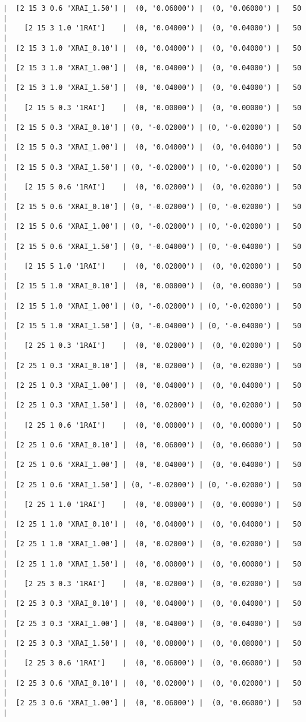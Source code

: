 \documentclass{article}
\begin{document}
\begin{verbatim}
|  [2 15 3 0.6 'XRAI_1.50'] |  (0, '0.06000') |  (0, '0.06000') |   50  |
|    [2 15 3 1.0 '1RAI']    |  (0, '0.04000') |  (0, '0.04000') |   50  |
|  [2 15 3 1.0 'XRAI_0.10'] |  (0, '0.04000') |  (0, '0.04000') |   50  |
|  [2 15 3 1.0 'XRAI_1.00'] |  (0, '0.04000') |  (0, '0.04000') |   50  |
|  [2 15 3 1.0 'XRAI_1.50'] |  (0, '0.04000') |  (0, '0.04000') |   50  |
|    [2 15 5 0.3 '1RAI']    |  (0, '0.00000') |  (0, '0.00000') |   50  |
|  [2 15 5 0.3 'XRAI_0.10'] | (0, '-0.02000') | (0, '-0.02000') |   50  |
|  [2 15 5 0.3 'XRAI_1.00'] |  (0, '0.04000') |  (0, '0.04000') |   50  |
|  [2 15 5 0.3 'XRAI_1.50'] | (0, '-0.02000') | (0, '-0.02000') |   50  |
|    [2 15 5 0.6 '1RAI']    |  (0, '0.02000') |  (0, '0.02000') |   50  |
|  [2 15 5 0.6 'XRAI_0.10'] | (0, '-0.02000') | (0, '-0.02000') |   50  |
|  [2 15 5 0.6 'XRAI_1.00'] | (0, '-0.02000') | (0, '-0.02000') |   50  |
|  [2 15 5 0.6 'XRAI_1.50'] | (0, '-0.04000') | (0, '-0.04000') |   50  |
|    [2 15 5 1.0 '1RAI']    |  (0, '0.02000') |  (0, '0.02000') |   50  |
|  [2 15 5 1.0 'XRAI_0.10'] |  (0, '0.00000') |  (0, '0.00000') |   50  |
|  [2 15 5 1.0 'XRAI_1.00'] | (0, '-0.02000') | (0, '-0.02000') |   50  |
|  [2 15 5 1.0 'XRAI_1.50'] | (0, '-0.04000') | (0, '-0.04000') |   50  |
|    [2 25 1 0.3 '1RAI']    |  (0, '0.02000') |  (0, '0.02000') |   50  |
|  [2 25 1 0.3 'XRAI_0.10'] |  (0, '0.02000') |  (0, '0.02000') |   50  |
|  [2 25 1 0.3 'XRAI_1.00'] |  (0, '0.04000') |  (0, '0.04000') |   50  |
|  [2 25 1 0.3 'XRAI_1.50'] |  (0, '0.02000') |  (0, '0.02000') |   50  |
|    [2 25 1 0.6 '1RAI']    |  (0, '0.00000') |  (0, '0.00000') |   50  |
|  [2 25 1 0.6 'XRAI_0.10'] |  (0, '0.06000') |  (0, '0.06000') |   50  |
|  [2 25 1 0.6 'XRAI_1.00'] |  (0, '0.04000') |  (0, '0.04000') |   50  |
|  [2 25 1 0.6 'XRAI_1.50'] | (0, '-0.02000') | (0, '-0.02000') |   50  |
|    [2 25 1 1.0 '1RAI']    |  (0, '0.00000') |  (0, '0.00000') |   50  |
|  [2 25 1 1.0 'XRAI_0.10'] |  (0, '0.04000') |  (0, '0.04000') |   50  |
|  [2 25 1 1.0 'XRAI_1.00'] |  (0, '0.02000') |  (0, '0.02000') |   50  |
|  [2 25 1 1.0 'XRAI_1.50'] |  (0, '0.00000') |  (0, '0.00000') |   50  |
|    [2 25 3 0.3 '1RAI']    |  (0, '0.02000') |  (0, '0.02000') |   50  |
|  [2 25 3 0.3 'XRAI_0.10'] |  (0, '0.04000') |  (0, '0.04000') |   50  |
|  [2 25 3 0.3 'XRAI_1.00'] |  (0, '0.04000') |  (0, '0.04000') |   50  |
|  [2 25 3 0.3 'XRAI_1.50'] |  (0, '0.08000') |  (0, '0.08000') |   50  |
|    [2 25 3 0.6 '1RAI']    |  (0, '0.06000') |  (0, '0.06000') |   50  |
|  [2 25 3 0.6 'XRAI_0.10'] |  (0, '0.02000') |  (0, '0.02000') |   50  |
|  [2 25 3 0.6 'XRAI_1.00'] |  (0, '0.06000') |  (0, '0.06000') |   50  |

\end{verbatim}
\end{document}
